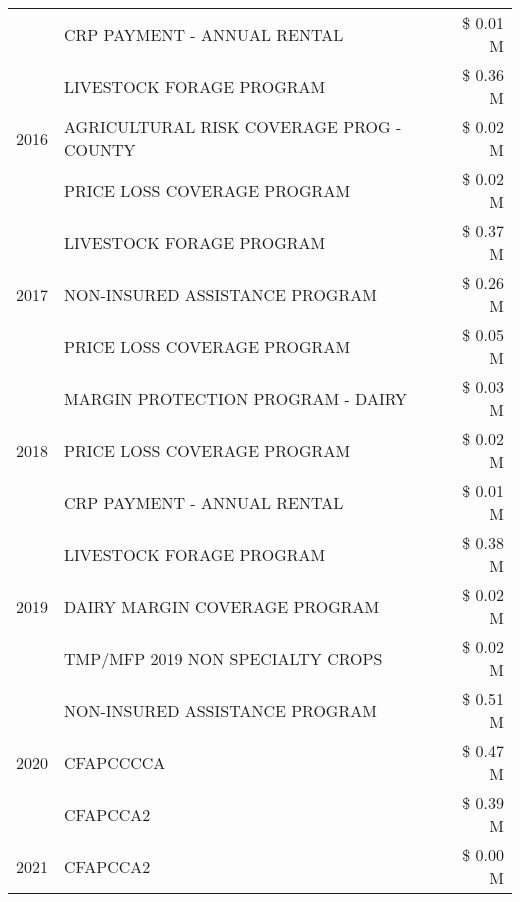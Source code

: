 \begin{tabular}{llr}
 & CRP PAYMENT - ANNUAL RENTAL & \$ 0.01 M \\
\cline{1-3}
\multirow[t]{3}{*}{2016} & LIVESTOCK FORAGE PROGRAM & \$ 0.36 M \\
 & AGRICULTURAL RISK COVERAGE PROG - COUNTY & \$ 0.02 M \\
 & PRICE LOSS COVERAGE PROGRAM & \$ 0.02 M \\
\cline{1-3}
\multirow[t]{3}{*}{2017} & LIVESTOCK FORAGE PROGRAM & \$ 0.37 M \\
 & NON-INSURED ASSISTANCE PROGRAM & \$ 0.26 M \\
 & PRICE LOSS COVERAGE PROGRAM & \$ 0.05 M \\
\cline{1-3}
\multirow[t]{3}{*}{2018} & MARGIN PROTECTION PROGRAM - DAIRY & \$ 0.03 M \\
 & PRICE LOSS COVERAGE PROGRAM & \$ 0.02 M \\
 & CRP PAYMENT - ANNUAL RENTAL & \$ 0.01 M \\
\cline{1-3}
\multirow[t]{3}{*}{2019} & LIVESTOCK FORAGE PROGRAM & \$ 0.38 M \\
 & DAIRY MARGIN COVERAGE PROGRAM & \$ 0.02 M \\
 & TMP/MFP 2019 NON SPECIALTY CROPS & \$ 0.02 M \\
\cline{1-3}
\multirow[t]{3}{*}{2020} & NON-INSURED ASSISTANCE PROGRAM & \$ 0.51 M \\
 & CFAPCCCCA & \$ 0.47 M \\
 & CFAPCCA2 & \$ 0.39 M \\
\cline{1-3}
2021 & CFAPCCA2 & \$ 0.00 M \\
\cline{1-3}
\bottomrule
\end{tabular}
